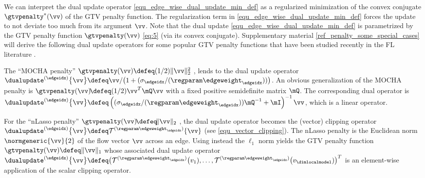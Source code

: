 \documentclass[lettersize,journal]{IEEEtran}
\begin{document}
We can interpret the dual update operator \eqref{equ_edge_wise_dual_update_min_def} as a regularized 
minimization of the convex conjugate $\gtvpenalty^{*}(\vv)$ of the GTV penalty function. The regularization 
term in \eqref{equ_edge_wise_dual_update_min_def} forces the update to not deviate too much from its argument $\vv$. 
Note that the dual update \eqref{equ_edge_wise_dual_update_min_def} is parametrized by the GTV penalty function
 $\gtvpenalty(\vv)$ \eqref{eq:5} (via its convex conjugate). %
Supplementary material \ref{ref_penalty_some_special_cases} will derive the following dual update operators for some popular 
GTV penalty functions that have been studied recently in the FL literature \cite{Smith2017,NetworkLasso,LocalizedLinReg2019,Sarchesh2021}. 

The ``{\rm MOCHA} penalty'' $\gtvpenalty(\vv) \defeq (1/2)\| \vv \|^{2}_{2}$ \cite{Smith2017}, lends to the dual update 
operator $\dualupdate^{(\edgeidx)} \big\{ \vv \big \} \defeq  \vv  / \big(1  + (\sigma_{\edgeidx}/(\regparam \edgeweight_{\edgeidx})) \big)$. 
An obvious generalization of the MOCHA penalty is $\gtvpenalty(\vv)\!\defeq (1/2)\vv^{T}\mQ\vv$ with a fixed positive semidefinite matrix $\mQ$. 
The corresponding dual operator is $\dualupdate^{(\edgeidx)} \big\{ \vv \big \} \defeq \left((\sigma_{\edgeidx}/(\regparam \edgeweight_{\edgeidx})) \mQ^{-1}+\mI\right)^{-1} \vv$, which is a linear operator. 

For the ``nLasso penalty'' $\gtvpenalty(\vv)\!\defeq\!\| \vv \|_{2}$ \cite{NetworkLasso,LocalizedLinReg2019}, 
the dual update operator becomes  the (vector) clipping operator $\dualupdate^{(\edgeidx)}\big\{ \vv \big \} \defeq  \mathcal{T}^{(\regparam \edgeweight_{\edgeidx })} \{\vv \}$ (see \eqref{equ_vector_clipping}). The nLasso penalty is the Euclidean norm $\normgeneric{\vv}{2}$ 
of the flow vector $\vv$ across an edge. Using instead the $\ell_{1}$ norm yields the GTV penalty function 
$\gtvpenalty(\vv) \defeq \| \vv \|_{1}$ \cite{Sarchesh2021}whose associated dual update operator 
$\dualupdate^{(\edgeidx)} \big\{ \vv \big \} \defeq \big( \mathcal{T}^{(\regparam \edgeweight_{\edgeidx})} \big(v_{1}),\ldots,\mathcal{T}^{(\regparam \edgeweight_{\edgeidx})} \big(v_{\dimlocalmodel})\big)^{T}$ is an element-wise application of the scalar clipping operator. %
\end{document}
